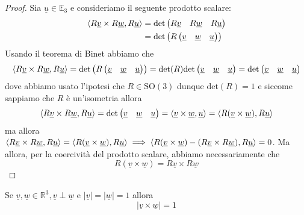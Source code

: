 \begin{proof}
Sia $\underline{u} \in \mathbb{E}_3$ e consideriamo il seguente prodotto scalare:
\begin{align*}
\langle R\underline{v} \times R\underline{w}, R\underline{u} \rangle &= \text{det}\begin{pmatrix}
R\underline{v} & R\underline{w} & R\underline{u}
\end{pmatrix} \\
&= \text{det}\left(R \begin{pmatrix}
\underline{v} & \underline{w} & \underline{u} 
\end{pmatrix}\right)
\end{align*}
Usando il teorema di Binet abbiamo che
$$
\langle R\underline{v} \times R\underline{w}, R\underline{u} \rangle = \text{det}\left(R \begin{pmatrix}
\underline{v} & \underline{w} & \underline{u} 
\end{pmatrix}\right) = \text{det}(R)\text{det}\begin{pmatrix}
\underline{v} & \underline{w} & \underline{u} 
\end{pmatrix} = \text{det}\begin{pmatrix}
	\underline{v} & \underline{w} & \underline{u}
\end{pmatrix}
$$
dove abbiamo usato l'ipotesi che $R \in \text{SO}(3)$ dunque $\text{det}(R) = 1$ e siccome sappiamo che $R$ è un'isometria allora
$$
\langle R\underline{v} \times R\underline{w}, R\underline{u} \rangle = \text{det}\begin{pmatrix} \underline{v} & \underline{w} & \underline{u} \end{pmatrix} = \langle \underline{v} \times \underline{w}, \underline{u} \rangle = \langle R(\underline{v} \times \underline{w}), R\underline{u} \rangle
$$
ma allora $\langle R\underline{v} \times R\underline{w}, R\underline{u} \rangle = \langle R(\underline{v} \times \underline{w}), R\underline{u} \rangle \implies \langle R(\underline{v} \times \underline{w}) - (R\underline{v} \times R\underline{w}), R\underline{u} \rangle = 0$. Ma allora, per la coercività del prodotto scalare, abbiamo necessariamente che
$$
R(\underline{v} \times \underline{w}) = R\underline{v} \times R\underline{w}
$$
\end{proof}
\begin{prop}
Se $\underline{v}, \underline{w} \in \mathbb{R}^3, \underline{v} \perp \underline{w}$ e $|\underline{v}| = |\underline{w}| = 1$ allora
$$
|\underline{v} \times \underline{w}| = 1
$$
\label{prop:norm_unit_cross_prod}
\end{prop}
